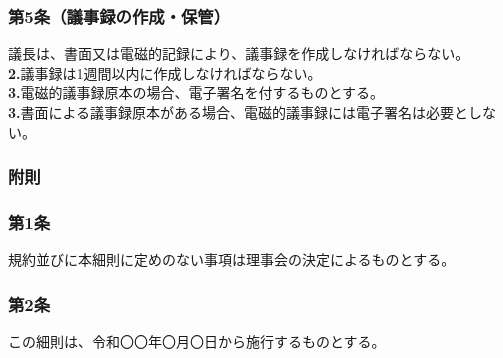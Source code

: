 \documentclass[12pt,uplatex]{jsarticle}
\begin{document}
\subsubsection*{ 第5条（議事録の作成・保管）}
議長は、書面又は電磁的記録により、議事録を作成しなければならない。\\
\textbf{2.}議事録は1週間以内に作成しなければならない。\\
\textbf{3.}電磁的議事録原本の場合、電子署名を付するものとする。\\
\textbf{3.}書面による議事録原本がある場合、電磁的議事録には電子署名は必要としない。\\


\begin{center}
\subsubsection*{附則}
\end{center}
\subsubsection*{第1条}
規約並びに本細則に定めのない事項は理事会の決定によるものとする。
\subsubsection*{第2条}
この細則は、令和〇〇年〇月〇日から施行するものとする。
\end{document}
